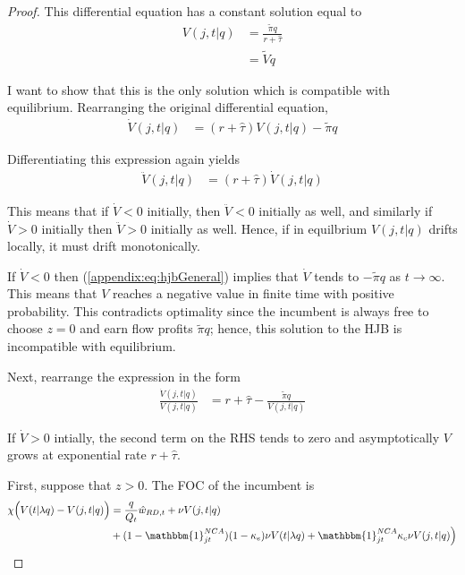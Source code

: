 \documentclass[11pt,english]{article}
\begin{document}
\begin{proof}
	This differential equation has a constant solution equal to 
	\begin{align}
	V(j,t|q) &= \frac{\tilde{\pi} q}{r + \hat{\tau}} \\
	&= \tilde{V} q 
	\end{align}
	
	I want to show that this is the only solution which is compatible with equilibrium. Rearranging the original differential equation,
	\begin{align}
	\dot{V}(j,t|q) &= (r + \hat{\tau}) V(j,t|q) - \tilde{\pi} q \label{appendix:eq:hjbGeneral}
	\end{align}	
	
	Differentiating this expression again yields
	\begin{align}
	\ddot{V}(j,t|q) &= (r + \hat{\tau}) \dot{V}(j,t|q) \label{appendix:eq:hjbGeneralDifferentiated}
	\end{align}
	
	This means that if $\dot{V} < 0$ initially, then $\ddot{V} < 0$ initially as well, and similarly if $\dot{V} > 0$ initially then $\ddot{V} > 0$ initially as well. Hence, if in equilbrium $V(j,t|q)$ drifts locally, it must drift monotonically.
	
	If $\dot{V} < 0$ then (\ref{appendix:eq:hjbGeneral}) implies that $\dot{V}$ tends to $-\tilde{\pi}q$ as $t \to \infty$. This means that $V$ reaches a negative value in finite time with positive probability. This contradicts optimality since the incumbent is always free to choose $z = 0$ and earn flow profits $\tilde{\pi} q$; hence, this solution to the HJB is incompatible with equilibrium. 
	
	Next, rearrange the expression in the form
	\begin{align}
	\frac{\dot{V}(j,t|q)}{V(j,t|q)} &= r + \hat{\tau} - \frac{\tilde{\pi}q}{V(j,t|q)}
	\end{align}
	
	
	If $\dot{V} > 0$ intially, the second term on the RHS tends to zero and asymptotically $V$ grows at exponential rate $r + \hat{\tau}$. 
	
	First, suppose that $z > 0$. The FOC of the incumbent is
	\begin{align}
	\chi \Big( V(t|\lambda q) - V(j,t|q) \Big) &= \frac{q}{Q_t} \hat{w}_{RD,t} + \nu V(j,t|q) \nonumber \\
	&+ (1 - \mathbbm{1}^{NCA}_{jt}) (1- \kappa_e) \nu V(t|\lambda q) + \mathbbm{1}^{NCA}_{jt}  \kappa_c \nu V(j,t|q) \Big) 
	\end{align}
	

\end{proof}
\end{document}
